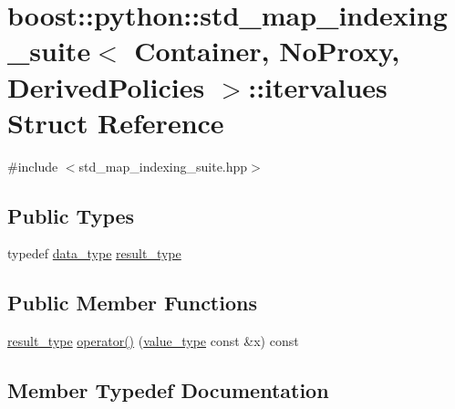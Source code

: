 \hypertarget{structboost_1_1python_1_1std__map__indexing__suite_1_1itervalues}{}\section{boost\+:\+:python\+:\+:std\+\_\+map\+\_\+indexing\+\_\+suite$<$ Container, No\+Proxy, Derived\+Policies $>$\+:\+:itervalues Struct Reference}
\label{structboost_1_1python_1_1std__map__indexing__suite_1_1itervalues}


{\ttfamily \#include $<$std\+\_\+map\+\_\+indexing\+\_\+suite.\+hpp$>$}

\subsection*{Public Types}
\begin{DoxyCompactItemize}
\item 
typedef \hyperlink{classboost_1_1python_1_1std__map__indexing__suite_a3e9a6a8b8ba34759cf0ba99fe5966041}{data\+\_\+type} \hyperlink{structboost_1_1python_1_1std__map__indexing__suite_1_1itervalues_a7d2f8df7d18009f2bad1363db4f718f3}{result\+\_\+type}
\end{DoxyCompactItemize}
\subsection*{Public Member Functions}
\begin{DoxyCompactItemize}
\item 
\hyperlink{structboost_1_1python_1_1std__map__indexing__suite_1_1itervalues_a7d2f8df7d18009f2bad1363db4f718f3}{result\+\_\+type} \hyperlink{structboost_1_1python_1_1std__map__indexing__suite_1_1itervalues_a36486ce19f8e08900aabe582d0502dc8}{operator()} (\hyperlink{classboost_1_1python_1_1std__map__indexing__suite_aff9ed68cf30e805a04a313d92c62ab38}{value\+\_\+type} const \&x) const 
\end{DoxyCompactItemize}


\subsection{Member Typedef Documentation}
